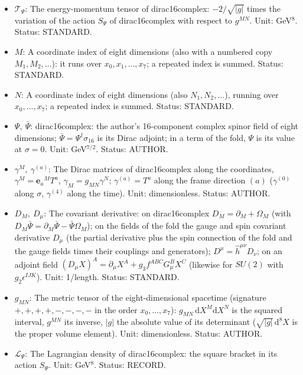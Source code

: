 \documentclass[
  10pt,
]{article}
\providecommand{\tightlist}{%
  \setlength{\itemsep}{0pt}\setlength{\parskip}{0pt}}
\begin{document}
\begin{itemize}
\tightlist
\item
  \(\mathcal{T}_\Psi\): The energy-momentum tensor of dirac16complex:
  \(-2/\sqrt{\lvert g\rvert}\) times the variation of the action
  \(S_\Psi\) of dirac16complex with respect to \(g^{MN}\). Unit:
  GeV\(^8\). Status: STANDARD.
\item
  \(M\): A coordinate index of eight dimensions (also with a numbered
  copy \(M_1, M_2, \dots\)): it runs over \(x_0, x_1, \dots, x_7\); a
  repeated index is summed. Status: STANDARD.
\item
  \(N\): A coordinate index of eight dimensions (also
  \(N_1, N_2, \dots\)), running over \(x_0, \dots, x_7\); a repeated
  index is summed. Status: STANDARD.
\item
  \(\Psi,\ \bar\Psi\): dirac16complex: the author's 16-component complex
  spinor field of eight dimensions;
  \(\bar\Psi = \Psi^\dagger\sigma_{16}\) is its Dirac adjoint; in a term
  of the fold, \(\Psi\) is its value at \(\sigma = 0\). Unit:
  GeV\(^{7/2}\). Status: AUTHOR.
\item
  \(\gamma^M,\ \gamma^{(a)}\): The Dirac matrices of dirac16complex
  along the coordinates, \(\gamma^M = \mathbf{e}_a{}^MT^a\),
  \(\gamma_M = g_{MN}\gamma^N\); \(\gamma^{(a)} = T^a\) along the frame
  direction \((a)\) (\(\gamma^{(0)}\) along \(\sigma\), \(\gamma^{(4)}\)
  along the time). Unit: dimensionless. Status: AUTHOR.
\item
  \(D_M,\ D_\mu\): The covariant derivative: on dirac16complex
  \(D_M = \partial_M + \Omega_M\) (with
  \(D_M\bar\Psi = \partial_M\bar\Psi - \bar\Psi\Omega_M\)); on the
  fields of the fold the gauge and spin covariant derivative \(D_\mu\)
  (the partial derivative plus the spin connection of the fold and the
  gauge fields times their couplings and generators);
  \(D^\mu = \hat h^{\mu\nu}D_\nu\); on an adjoint field
  \((D_\mu X)^A = \partial_\mu X^A + g_3f^{ABC}G^B_\mu X^C\) (likewise
  for \(SU(2)\) with \(g_2\epsilon^{IJK}\)). Unit: 1/length. Status:
  STANDARD.
\item
  \(g_{MN}\): The metric tensor of the eight-dimensional spacetime
  (signature \(+,+,+,+,-,-,-,-\) in the order \(x_0, \dots, x_7\)):
  \(g_{MN}\,\mathrm{d}X^M\mathrm{d}X^N\) is the squared interval,
  \(g^{MN}\) its inverse, \(\lvert g\rvert\) the absolute value of its
  determinant (\(\sqrt{\lvert g\rvert}\,\mathrm{d}^8X\) is the proper
  volume element). Unit: dimensionless. Status: AUTHOR.
\item
  \(\mathcal{L}_\Psi\): The Lagrangian density of dirac16complex: the
  square bracket in its action \(S_\Psi\). Unit: GeV\(^8\). Status:
  RECORD.
\end{itemize}
\end{document}
